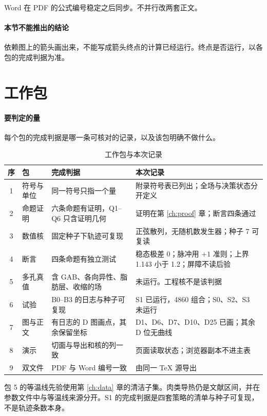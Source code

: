Word 在 PDF 的公式编号稳定之后同步。不并行改两套正文。

\paragraph{本节不能推出的结论}
依赖图上的箭头画出来，不能写成箭头终点的计算已经运行。终点是否运行，以各包的完成判据为准。

\section{工作包}

\paragraph{要判定的量}
每个包的完成判据是哪一条可核对的记录，以及该包明确不做什么。

\begin{table}[ht]
\centering
\caption{工作包与本次记录}
\begin{tabularx}{\textwidth}{clXX}
\toprule
序 & 包 & 完成判据 & 本次记录 \\
\midrule
1 & 符号与单位 & 同一符号只指一个量 & 附录符号表已列出；全场与决策状态分开定义 \\
2 & 命题证明 & 六条命题有证明，Q1--Q6 只含证明几何 & 证明在第 \ref{ch:proof} 章；断言四条通过 \\
3 & 数值核 & 固定种子下轨迹可复现 & 正弦散列，无随机数发生器；种子 7 可复读 \\
4 & 断言 & 四条命题有独立测试 & 稳态极差 0；脉冲用 \(+1\) 准则；上界 1.143 小于 1.2；屏障不读后验 \\
5 & 多孔真值 & 含 GAB、各向异性、脂肪层、收缩的场 & 未运行。工程核不是该判据 \\
6 & 试验 & B0--B3 的日志与种子可复现 & S1 已运行，4860 组合；S0、S2、S3 未运行 \\
7 & 图与正文 & 有日志的 D 图画点，其余保留坐标 & D1、D6、D7、D10、D25 已画；其余 D 位无曲线 \\
8 & 演示 & 切面与导出和核的列一致 & 页面读取状态；浏览器副本不进主表 \\
9 & 双文件 & PDF 与 Word 编号一致 & 由同一 TeX 源导出 \\
\bottomrule
\end{tabularx}
\end{table}

包 5 的等温线先验使用第 \ref{ch:data} 章的清洁子集。肉类导热仍是文献区间，并在参数文件中与等温线来源分开。S1 的完成判据是四套策略的清单与种子可复现，不是轨迹条数本身。


